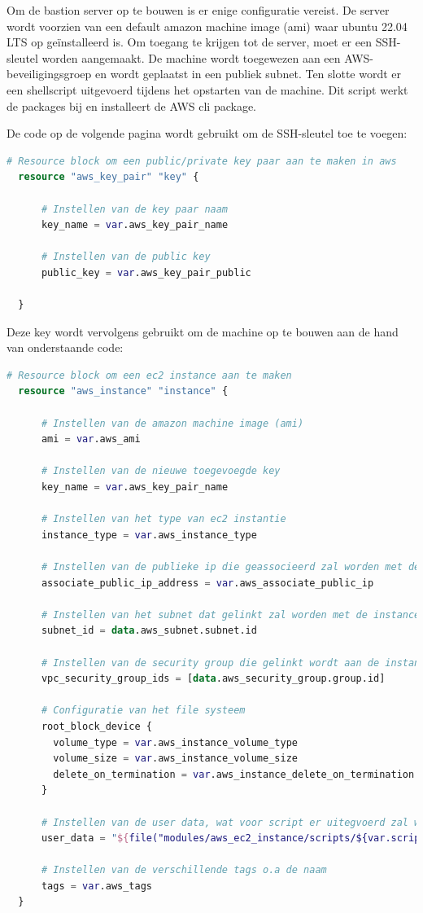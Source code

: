 Om de bastion server op te bouwen is er enige configuratie vereist. De server wordt voorzien van een default amazon machine image (ami) waar ubuntu 22.04 LTS op geïnstalleerd is. Om toegang te krijgen tot de server, moet er een SSH-sleutel worden aangemaakt. De machine wordt toegewezen aan een AWS-beveiligingsgroep en wordt geplaatst in een publiek subnet. Ten slotte wordt er een shellscript uitgevoerd tijdens het opstarten van de machine. Dit script werkt de packages bij en installeert de AWS cli package. 
\newline

De code op de volgende pagina wordt gebruikt om de SSH-sleutel toe te voegen:
\clearpage

\begin{lstlisting}[language=terraform]  
  # Resource block om een public/private key paar aan te maken in aws
  resource "aws_key_pair" "key" {
      
      # Instellen van de key paar naam
      key_name = var.aws_key_pair_name
      
      # Instellen van de public key 
      public_key = var.aws_key_pair_public
    
  }
\end{lstlisting}

\vspace{0.5cm}
Deze key wordt vervolgens gebruikt om de machine op te bouwen aan de hand van onderstaande code:
\newline

\begin{lstlisting}[language=terraform]  
  # Resource block om een ec2 instance aan te maken
  resource "aws_instance" "instance" {
  
      # Instellen van de amazon machine image (ami)
      ami = var.aws_ami
  
      # Instellen van de nieuwe toegevoegde key
      key_name = var.aws_key_pair_name
  
      # Instellen van het type van ec2 instantie
      instance_type = var.aws_instance_type
  
      # Instellen van de publieke ip die geassocieerd zal worden met de instance
      associate_public_ip_address = var.aws_associate_public_ip
  
      # Instellen van het subnet dat gelinkt zal worden met de instance
      subnet_id = data.aws_subnet.subnet.id
  
      # Instellen van de security group die gelinkt wordt aan de instance
      vpc_security_group_ids = [data.aws_security_group.group.id]
  
      # Configuratie van het file systeem
      root_block_device {
        volume_type = var.aws_instance_volume_type
        volume_size = var.aws_instance_volume_size
        delete_on_termination = var.aws_instance_delete_on_termination
      }
      
      # Instellen van de user data, wat voor script er uitegvoerd zal worden bij de opstart van de machine 
      user_data = "${file("modules/aws_ec2_instance/scripts/${var.script}")}"
  
      # Instellen van de verschillende tags o.a de naam
      tags = var.aws_tags
  }
\end{lstlisting}

